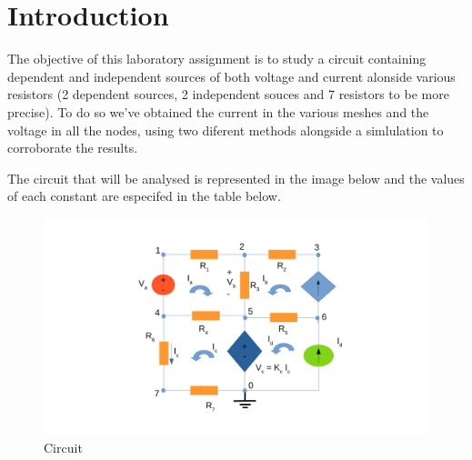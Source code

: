 \newpage
\section{Introduction}
\label{sec:introduction}

The objective of this laboratory assignment is to study a circuit containing dependent and independent sources of both voltage and current alonside various resistors (2 dependent sources, 2 independent souces and 7 resistors to be more precise). To do so we've obtained the current in the various meshes and the voltage in all the nodes, using two diferent methods alongside a simlulation to corroborate the results.


The circuit that will be analysed is represented in the image below and the values of each constant are especifed in the table below.

\begin{figure}[ht]
\centering
\includegraphics[width = 15cm]{system2.pdf}
\caption {Circuit}
\end{figure}


